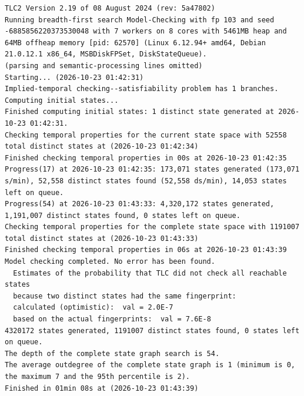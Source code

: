 \documentclass[11pt,a4paper]{article}
\begin{document}
\begin{lstlisting}[float, caption={SaeProvision\_ring.cfg result}, captionpos=t, label={lst:tlc-saeprovision-ring}]
TLC2 Version 2.19 of 08 August 2024 (rev: 5a47802)
Running breadth-first search Model-Checking with fp 103 and seed -6885856220373530048 with 7 workers on 8 cores with 5461MB heap and 64MB offheap memory [pid: 62570] (Linux 6.12.94+ amd64, Debian 21.0.12.1 x86_64, MSBDiskFPSet, DiskStateQueue).
(parsing and semantic-processing lines omitted)
Starting... (2026-10-23 01:42:31)
Implied-temporal checking--satisfiability problem has 1 branches.
Computing initial states...
Finished computing initial states: 1 distinct state generated at 2026-10-23 01:42:31.
Checking temporal properties for the current state space with 52558 total distinct states at (2026-10-23 01:42:34)
Finished checking temporal properties in 00s at 2026-10-23 01:42:35
Progress(17) at 2026-10-23 01:42:35: 173,071 states generated (173,071 s/min), 52,558 distinct states found (52,558 ds/min), 14,053 states left on queue.
Progress(54) at 2026-10-23 01:43:33: 4,320,172 states generated, 1,191,007 distinct states found, 0 states left on queue.
Checking temporal properties for the complete state space with 1191007 total distinct states at (2026-10-23 01:43:33)
Finished checking temporal properties in 06s at 2026-10-23 01:43:39
Model checking completed. No error has been found.
  Estimates of the probability that TLC did not check all reachable states
  because two distinct states had the same fingerprint:
  calculated (optimistic):  val = 2.0E-7
  based on the actual fingerprints:  val = 7.6E-8
4320172 states generated, 1191007 distinct states found, 0 states left on queue.
The depth of the complete state graph search is 54.
The average outdegree of the complete state graph is 1 (minimum is 0, the maximum 7 and the 95th percentile is 2).
Finished in 01min 08s at (2026-10-23 01:43:39)
\end{lstlisting}
\bigskip
\end{document}
